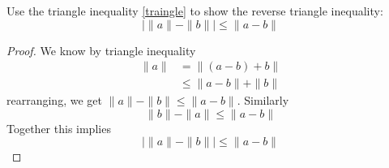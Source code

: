 \documentclass[openany]{book}
\begin{document}
\begin{prob}
    Use the triangle inequality \ref{traingle} to show the reverse triangle inequality:
    \begin{equation*}
        \bigg|\|a\|-\|b\|\bigg|\leq\|a-b\|
    \end{equation*}
\end{prob}
\begin{proof}
    We know by triangle inequality 
    \begin{align*}
        \|a\|&=\|(a-b)+b\|\\
        &\leq \|a-b\|+\|b\|
    \end{align*}
    rearranging, we get $\|a\|-\|b\|\leq\|a-b\|$. Similarly 
    \begin{equation*}
        \|b\|-\|a\|\leq \|a-b\|
    \end{equation*}
    Together this implies 
    \begin{equation*}
        \bigg|\|a\|-\|b\|\bigg|\leq\|a-b\|
    \end{equation*}
\end{proof}
\end{document}
